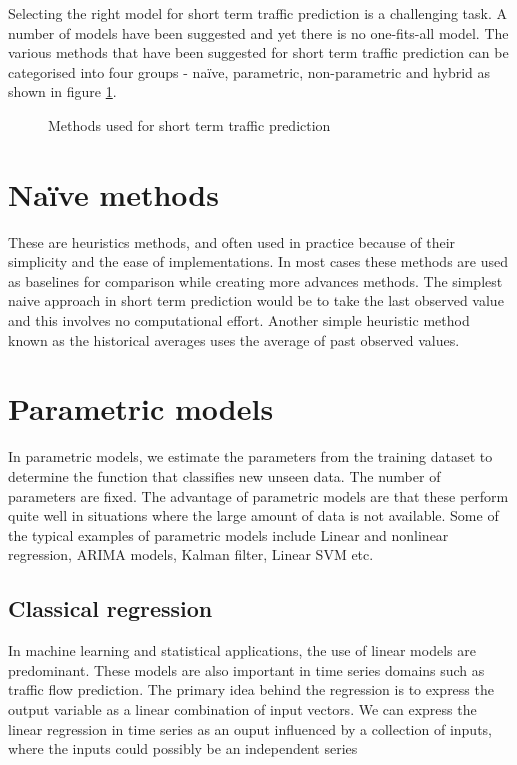 Selecting the right model for short term traffic prediction is a challenging task. A number of
models have been suggested and yet there is no one-fits-all model. The various methods that have
been suggested for short term traffic prediction can be categorised into four groups -
naïve, parametric, non-parametric and hybrid as shown in figure \ref{fig:taxonomyTrafficPrediction}.


\begin{figure}
\centering
{}
\caption{Methods used for short term traffic prediction} \label{fig:taxonomyTrafficPrediction}
\end{figure}

\section{Naïve methods}
These are heuristics methods, and often used in practice because of their simplicity and the ease
of implementations. In most cases these methods are used as baselines for comparison while
creating more advances methods. The simplest naive approach in short term prediction would be to
take the last observed value and this involves no computational effort. Another simple heuristic
method known as the historical averages uses the average of past observed values.

\section{Parametric models}
In parametric models, we estimate the parameters from the training dataset to determine the
function that classifies new unseen data. The number of parameters are fixed. The advantage of
parametric models are that these perform quite well in situations where the large amount of data
is not available. Some of the typical examples of parametric models include Linear and
nonlinear regression, ARIMA models, Kalman filter, Linear SVM etc.

\subsection{Classical regression}
In machine learning and statistical applications, the use of linear models are predominant. These
models are also important in time series domains such as traffic flow prediction. The primary
idea behind the regression is to express the output variable as a linear combination of input
vectors. We can express the linear regression in time series as an ouput influenced by a
collection of inputs, where the inputs could possibly be an independent series

